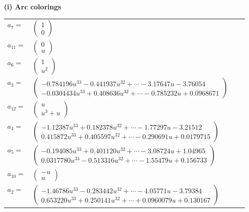 \documentclass[1p]{elsarticle_modified}
\theoremstyle{definition}
\begin{document}
\flushleft \textbf{(i) Arc colorings}\\
\begin{tabular}{m{7pt} m{180pt} m{7pt} m{180pt} }
\flushright $a_{7}=$&$\begin{pmatrix}1\\0\end{pmatrix}$ \\
\flushright $a_{11}=$&$\begin{pmatrix}0\\u\end{pmatrix}$ \\
\flushright $a_{6}=$&$\begin{pmatrix}1\\u^2\end{pmatrix}$ \\
\flushright $a_{3}=$&$\begin{pmatrix}-0.784196 u^{33}-0.441937 u^{32}+\cdots-3.17647 u-3.76054\\-0.0304434 u^{33}+0.408636 u^{32}+\cdots-0.785232 u+0.0968671\end{pmatrix}$ \\
\flushright $a_{12}=$&$\begin{pmatrix}u\\u^3+u\end{pmatrix}$ \\
\flushright $a_{4}=$&$\begin{pmatrix}-1.12387 u^{33}+0.182378 u^{32}+\cdots-1.77297 u-3.21512\\0.415872 u^{33}+0.405597 u^{32}+\cdots-0.290691 u+0.0179715\end{pmatrix}$ \\
\flushright $a_{5}=$&$\begin{pmatrix}-0.194085 u^{33}+0.401120 u^{32}+\cdots-3.08724 u+1.04965\\0.0317780 u^{33}-0.513316 u^{32}+\cdots-1.55479 u+0.156733\end{pmatrix}$ \\
\flushright $a_{10}=$&$\begin{pmatrix}- u\\u\end{pmatrix}$ \\
\flushright $a_{2}=$&$\begin{pmatrix}-1.46786 u^{33}-0.283442 u^{32}+\cdots-4.05771 u-3.79384\\0.653220 u^{33}+0.250141 u^{32}+\cdots+0.0960079 u+0.130167\end{pmatrix}$ \\

\end{tabular}
\end{document}

